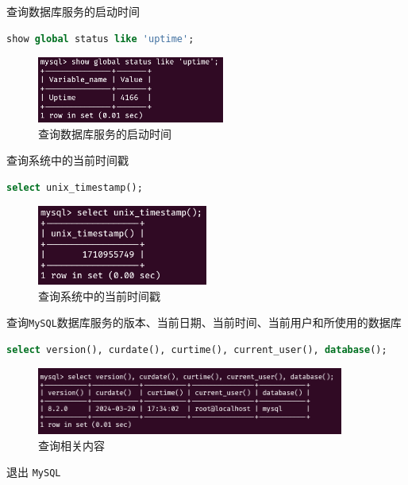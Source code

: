 \documentclass{article}
\begin{document}
查询数据库服务的启动时间

\begin{lstlisting}[language=sql]
show global status like 'uptime';
\end{lstlisting}

\begin{figure}[H]
  \centering
  \includegraphics[width=0.55\textwidth]{img/18.png}
  \caption{查询数据库服务的启动时间}
\end{figure}

查询系统中的当前时间戳

\begin{lstlisting}[language=sql]
select unix_timestamp();
\end{lstlisting}

\begin{figure}[H]
  \centering
  \includegraphics[width=0.5\textwidth]{img/19.png}
  \caption{查询系统中的当前时间戳}
\end{figure}

查询\texttt{MySQL}数据库服务的版本、当前日期、当前时间、当前用户和所使用的数据库

\begin{lstlisting}[language=sql]
select version(), curdate(), curtime(), current_user(), database();
\end{lstlisting}

\begin{figure}[H]
  \centering
  \includegraphics[width=0.9\textwidth]{img/20.png}
  \caption{查询相关内容}
\end{figure}

退出 \texttt{MySQL}
\end{document}
